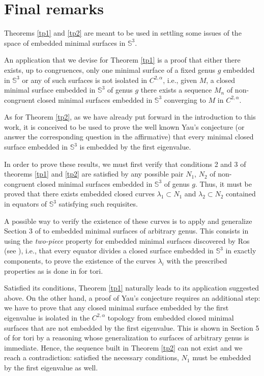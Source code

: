 \documentclass{article}
\def\S3{{\mathbb S^3}}
\begin{document}
\section{Final remarks}\label{sfr}

Theorems \ref{tp1} and \ref{tp2} are meant to be used in settling some issues of the space of embedded minimal surfaces in $\S3$. 

An application that we devise for Theorem \ref{tp1}  is a proof that either there exists, up to congruences, only one minimal surface of a fixed genus $g$ embedded in $\S3$ or any of such surfaces is not isolated in $C^{2,\alpha}$, i.e., given $M$, a closed minimal surface embedded in $\S3$ of genus $g$ there exists a sequence $M_n$ of non-congruent closed minimal surfaces embedded in $\S3$ converging to $M$ in 
$C^{2,\alpha}$.       

As for Theorem \ref{tp2}, as we have already put forward in the introduction to this work, it is conceived to be used to prove the well known Yau's conjecture (or answer the corresponding question in the affirmative) that every minimal closed surface embedded in $\S3$ is embedded by the first eigenvalue.

In order to prove these results, we must first verify that conditions 2 and 3 of theorems \ref{tp1} and \ref{tp2} are satisfied by any possible pair $N_1$, $N_2$ of non-congruent closed minimal surfaces embedded in $\S3$ of genus $g$. Thus, it must be proved that there exists embedded closed curves $\lambda_1\subset N_1$ and $\lambda_2\subset N_2$ contained in equators of $\S3$ satisfying such requisites. 

A possible way to verify the existence of these curves is to apply and generalize Section 3 of \cite{p1} to embedded minimal surfaces of arbitrary genus. This consists in using the {\it two-piece} property for embedded minimal surfaces discovered by Ros (see \cite{rs}), i.e., that every equator divides a closed surface embedded in $\S3$ in exactly components, to prove the existence of the curves $\lambda_i$ with the prescribed properties as is done in \cite{p1} for tori.

Satisfied its conditions, Theorem \ref{tp1} naturally leads to its application suggested above. On the other hand, a proof of Yau's conjecture requires an additional  step: we  have to prove that any closed minimal surface embedded by the first eigenvalue is isolated in the $C^{2,\alpha}$ topology from embedded closed minimal surfaces that are not embedded by the first eigenvalue. This is shown in Section 5 of \cite{p1} for tori by a reasoning whose generalization to surfaces of arbitrary genus is immediate. 
Hence, the sequence built in Theorem \ref{tp2} can not exist and we reach a contradiction: satisfied the necessary conditions, $N_1$ must be embedded by the first eigenvalue as well.
\end{document}
